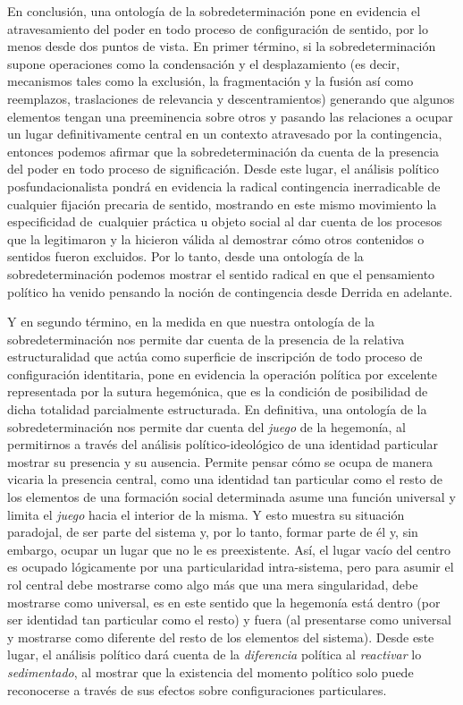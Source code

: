 En conclusión, una ontología de la sobredeterminación pone en evidencia el atravesamiento del poder en todo proceso de configuración de sentido, por lo menos desde dos puntos de vista. En primer término, si la sobredeterminación supone operaciones como la condensación y el desplazamiento (es decir, mecanismos tales como la exclusión, la fragmentación y la fusión así como reemplazos, traslaciones de relevancia y descentramientos) generando que algunos elementos tengan una preeminencia sobre otros y pasando las relaciones a ocupar un lugar definitivamente central en un contexto atravesado por la contingencia, entonces podemos afirmar que la sobredeterminación da cuenta de la presencia del poder en todo proceso de significación. Desde este lugar, el análisis político posfundacionalista pondrá en evidencia la radical contingencia inerradicable de cualquier fijación precaria de sentido, mostrando en este mismo movimiento la especificidad de~cualquier práctica u objeto social al dar cuenta de los procesos que la legitimaron y la hicieron válida al demostrar cómo otros contenidos o sentidos fueron excluidos. Por lo tanto, desde una ontología de la sobredeterminación podemos mostrar el sentido radical en que el pensamiento político ha venido pensando la noción de contingencia desde Derrida en adelante.

Y en segundo término, en la medida en que nuestra ontología de la sobredeterminación nos permite dar cuenta de la presencia de la relativa estructuralidad que actúa como superficie de inscripción de todo proceso de configuración identitaria, pone en evidencia la operación política por excelente representada por la sutura hegemónica, que es la condición de posibilidad de dicha totalidad parcialmente estructurada. En definitiva, una ontología de la sobredeterminación nos permite dar cuenta del \emph{juego} de la hegemonía, al permitirnos a través del análisis político-ideológico de una identidad particular mostrar su presencia y su ausencia. Permite pensar cómo se ocupa de manera vicaria la presencia central, como una identidad tan particular como el resto de los elementos de una formación social determinada asume una función universal y limita el \emph{juego} hacia el interior de la misma. Y esto muestra su situación paradojal, de ser parte del sistema y, por lo tanto, formar parte de él y, sin embargo, ocupar un lugar que no le es preexistente. Así, el lugar vacío del centro es ocupado lógicamente por una particularidad intra-sistema, pero para asumir el rol central debe mostrarse como algo más que una mera singularidad, debe mostrarse como universal, es en este sentido que la hegemonía está dentro (por ser identidad tan particular como el resto) y fuera (al presentarse como universal y mostrarse como diferente del resto de los elementos del sistema). Desde este lugar, el análisis político dará cuenta de la \emph{diferencia} política al \emph{reactivar} lo \emph{sedimentado}, al mostrar que la existencia del momento político solo puede reconocerse a través de sus efectos sobre configuraciones particulares.

